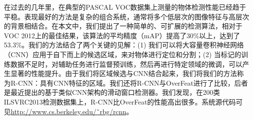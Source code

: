 \documentclass[../main.tex]{subfile}
\begin{document}
在过去的几年里，在典型的PASCAL VOC数据集上测量的物体检测性能已经趋于平稳。表现最好的方法是复杂的组合系统，通常将多个低层次的图像特征与高层次的背景相结合。在本文中，我们提出了一种简单的、可扩展的检测算法，相对于VOC 2012上的最佳结果，该算法的平均精度（mAP）提高了30\%以上，达到了53.3\%。我们的方法结合了两个关键的见解：(1) 我们可以将大容量卷积神经网络（CNN）应用于自下而上的候选区域，来对物体进行定位和分割；(2) 当标记的训练数据不足时，对辅助任务进行监督预训练，然后再进行特定领域的微调，可以产生显著的性能提升。由于我们将区域候选与CNN结合起来，我们将我们的方法称为R-CNN：具有CNN特征的区域。我们还将R-CNN与OverFeat进行了比较，后者是最近提出的基于类似CNN架构的滑动窗口检测器。我们发现，在200类ILSVRC2013检测数据集上，R-CNN比OverFeat的性能高出很多。系统源代码可见\href{http://www.cs.berkeley.edu/˜rbg/rcnn}{http://www.cs.berkeley.edu/˜rbg/rcnn}。
\end{document}
